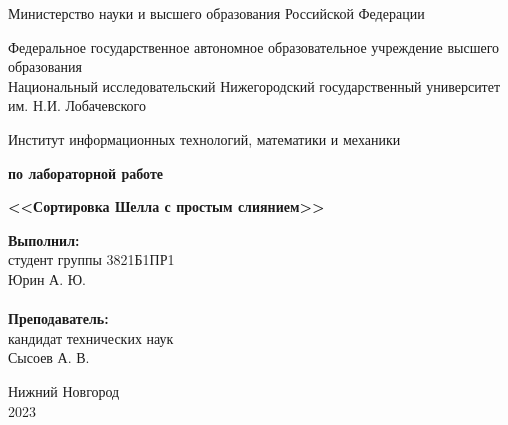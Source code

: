 \documentclass{report}
\begin{document}
\begin{titlepage}

\begin{center}
Министерство науки и высшего образования Российской Федерации
\end{center}

\begin{center}
Федеральное государственное автономное образовательное учреждение высшего образования \\
Национальный исследовательский Нижегородский государственный университет им. Н.И. Лобачевского
\end{center}

\begin{center}
Институт информационных технологий, математики и механики
\end{center}

\vspace{4em}

\begin{center}
\textbf{ по лабораторной работе} \\
\end{center}
\begin{center}
\textbf{\Large<<Сортировка Шелла с простым слиянием>>} \\
\end{center}

\vspace{4em}

\newbox{\lbox}
\newlength{\maxl}
\setlength{\maxl}{\wd\lbox}
\hfill\parbox{7cm}{
\hspace*{5cm}\hspace*{-5cm}\textbf{Выполнил:} \\ студент группы 3821Б1ПР1\\Юрин А. Ю.\\
\\
\hspace*{5cm}\hspace*{-5cm}\textbf{Преподаватель:}\\ кандидат технических наук\\Сысоев А. В.\\
}
\vspace{\fill}

\begin{center} Нижний Новгород \\ 2023 \end{center}

\end{titlepage}
\end{document}
